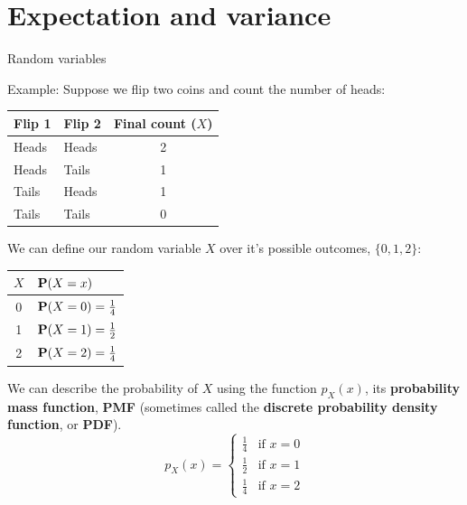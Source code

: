 \documentclass[compress, 8pt]{beamer}
\begin{document}
\section{Expectation and variance}
\miniframesoff
\begin{frame}
    \tableofcontents[currentsection]
\end{frame}
\miniframeson

\begin{frame}{Random variables}


Example: Suppose we flip two coins and count the number of heads:
\begin{table}
\begin{tabular}{llc}
Flip 1 &Flip 2  &Final count ($X$) \\
\hline
Heads   &Heads  &2 \\
Heads   &Tails  &1 \\
Tails   &Heads  &1 \\
Tails   &Tails  &0 
\end{tabular}
\end{table}

We can define our random variable $X$ over it's possible outcomes, $\{0, 1, 2\}$:
\begin{table}
\begin{tabular}{cl}
$X$ &$\mathbf{P} (X = x)$ \\
\hline
0 & $\mathbf{P} (X = 0) = \frac{1}{4}$\\
1 &$\mathbf{P} (X = 1) = \frac{1}{2}$\\
2 &$\mathbf{P} (X = 2) = \frac{1}{4}$\\
\end{tabular}
\end{table}

We can describe the probability of $X$ using the function $p_X(x)$, its \textbf{probability mass function}, \textbf{PMF} (sometimes called the \textbf{discrete probability density function}, or \textbf{PDF}).
\begin{equation*}
    p_X(x) = \begin{cases}
    \frac{1}{4} &\text{if } x = 0 \\
    \frac{1}{2} &\text{if }x=1 \\
    \frac{1}{4} &\text{if }x=2
    \end{cases}
\end{equation*}



\end{frame}
\end{document}
